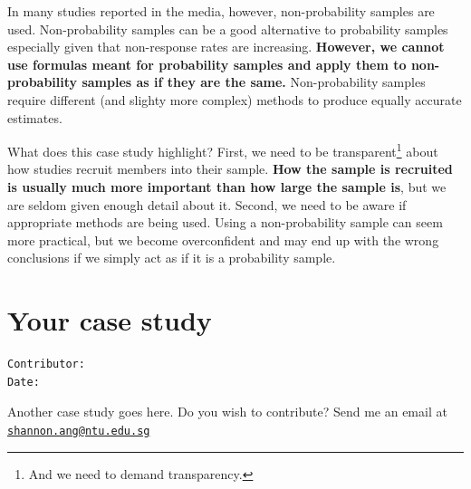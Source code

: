 \documentclass[openany]{book}
\let\rmarkdownfootnote\footnote%
\def\footnote{\protect\rmarkdownfootnote}
\begin{document}
In many studies reported in the media, however, non-probability samples
are used. Non-probability samples can be a good alternative to
probability samples especially given that non-response rates are
increasing. \textbf{However, we cannot use formulas meant for
probability samples and apply them to non-probability samples as if they
are the same.} Non-probability samples require different (and slighty
more complex) methods to produce equally accurate estimates.

What does this case study highlight? First, we need to be
transparent\footnote{And we need to demand transparency.} about how
studies recruit members into their sample. \textbf{How the sample is
recruited is usually much more important than how large the sample is},
but we are seldom given enough detail about it. Second, we need to be
aware if appropriate methods are being used. Using a non-probability
sample can seem more practical, but we become overconfident and may end
up with the wrong conclusions if we simply act as if it is a probability
sample.

\chapter{Your case study}\label{case3}

\begin{verbatim}
Contributor: 
Date: 
\end{verbatim}

Another case study goes here. Do you wish to contribute? Send me an
email at
\href{mailto:shannon.ang@ntu.edu.sg}{\nolinkurl{shannon.ang@ntu.edu.sg}}


\end{document}
